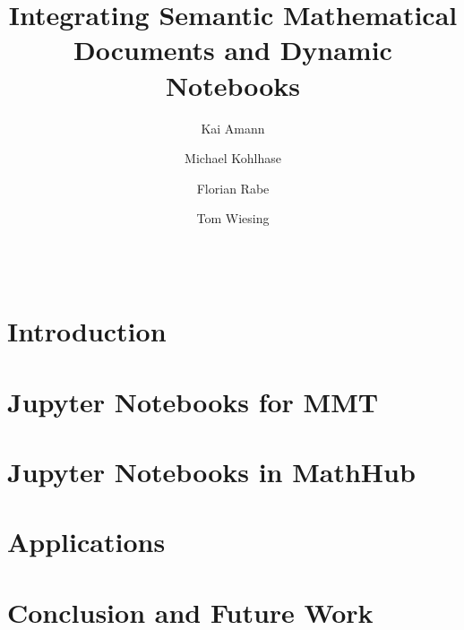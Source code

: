 \documentclass{llncs}
\title{Integrating Semantic Mathematical Documents and Dynamic Notebooks}
\author{Kai Amann \and Michael Kohlhase \and Florian Rabe \and Tom Wiesing}
\institute{Computer Science, FAU Erlangen-N\"urnberg}
\begin{document}
\maketitle
\begin{abstract}\strut\\\end{abstract}


\section{Introduction}\label{sec:intro}


\section{Jupyter Notebooks for MMT}\label{sec:mmt-jp}


\section{Jupyter Notebooks in MathHub}\label{sec:nb-mh}


\section{Applications}\label{sec:mitm-nb}


\section{Conclusion and Future Work}\label{sec:concl}


\printbibliography
\end{document}

